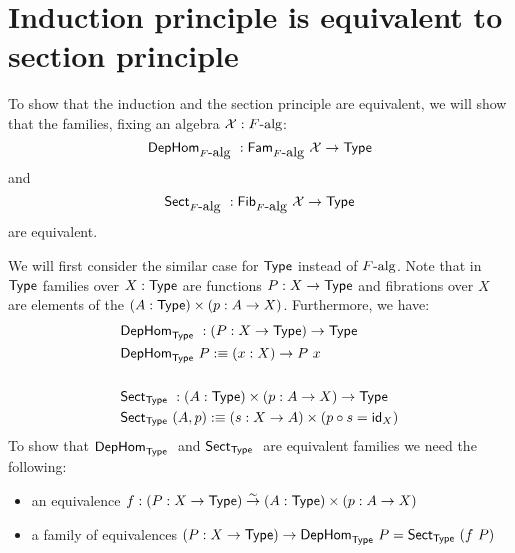 \documentclass[a4paper,10pt]{report}
\begin{document}
\section{Induction principle is equivalent to section principle}
\label{sec:oitsectioninduction}

To show that the induction and the section principle are equivalent,
we will show that the families, fixing an algebra $\mathcal{X} : F\mbox{-alg}$:
$$
\mathsf{DepHom}_{F\mbox{-alg}}\ : \mathsf{Fam}_{F\mbox{-alg}}\ \mathcal{X} \to \mathsf{Type}
$$
and
$$
\mathsf{Sect}_{F\mbox{-alg}}\ : \mathsf{Fib}_{F\mbox{-alg}}\ \mathcal{X} \to \mathsf{Type}
$$
are equivalent.

We will first consider the similar case for $\mathsf{Type}$ instead of
$F\mbox{-alg}$. Note that in $\mathsf{Type}$ families over $X : \mathsf{Type}$ are
functions $P : X \to \mathsf{Type}$ and fibrations over $X$ are elements of
the $(A : \mathsf{Type}) \times (p : A \to X)$. Furthermore, we have:
%
\begin{align*}
  &\mathsf{DepHom}_{\mathsf{Type}}\ : (P : X \to \mathsf{Type}) \to \mathsf{Type} \\
  &\mathsf{DepHom}_{\mathsf{Type}}\ P :\equiv (x : X) \to P\ x \\
  &\\
  &\mathsf{Sect}_{\mathsf{Type}}\ : (A : \mathsf{Type}) \times (p : A \to X) \to \mathsf{Type} \\
  &\mathsf{Sect}_{\mathsf{Type}}\ (A , p) :\equiv (s : X \to A) \times (p \circ s = \mathsf{id}_{X})
\end{align*}
%
To show that $\dephom{\Type}$ and $\sectionof{\Type}$ are equivalent
families we need the following:
\begin{itemize}
\item an equivalence $f : (P : X \to \mathsf{Type}) \overset{\sim}\to (A : \mathsf{Type}) \times (p : A \to X)$
\item a family of equivalences $(P : X \to \mathsf{Type}) \to \mathsf{DepHom}_{\mathsf{Type}}\ P = \mathsf{Sect}_{\mathsf{Type}}\ (f\ P)$
\end{itemize}
\end{document}
